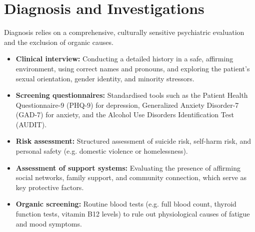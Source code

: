 \section*{Diagnosis and Investigations}
Diagnosis relies on a comprehensive, culturally sensitive psychiatric evaluation and the exclusion of organic causes.
\begin{itemize}
    \item \textbf{Clinical interview:} Conducting a detailed history in a safe, affirming environment, using correct names and pronouns, and exploring the patient's sexual orientation, gender identity, and minority stressors.
    \item \textbf{Screening questionnaires:} Standardised tools such as the Patient Health Questionnaire-9 (PHQ-9) for depression, Generalized Anxiety Disorder-7 (GAD-7) for anxiety, and the Alcohol Use Disorders Identification Test (AUDIT).
    \item \textbf{Risk assessment:} Structured assessment of suicide risk, self-harm risk, and personal safety (e.g. domestic violence or homelessness).
    \item \textbf{Assessment of support systems:} Evaluating the presence of affirming social networks, family support, and community connection, which serve as key protective factors.
    \item \textbf{Organic screening:} Routine blood tests (e.g. full blood count, thyroid function tests, vitamin B12 levels) to rule out physiological causes of fatigue and mood symptoms.
\end{itemize}

